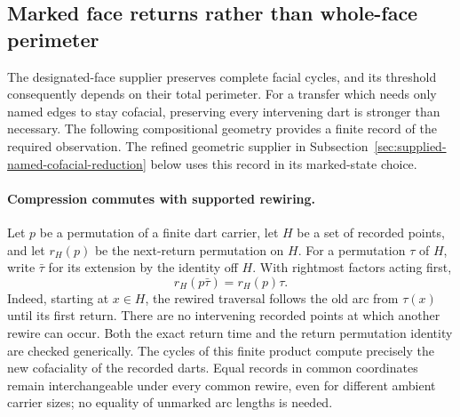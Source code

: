 \subsection{Marked face returns rather than whole-face perimeter}
\label{sec:marked-face-return-rewire}

The designated-face supplier preserves complete facial cycles, and its
threshold consequently depends on their total perimeter. For a transfer
which needs only named edges to stay cofacial, preserving every intervening
dart is stronger than necessary. The following compositional geometry
provides a finite record of the required observation. The refined geometric
supplier in Subsection~\ref{sec:supplied-named-cofacial-reduction} below
uses this record in its marked-state choice.

\paragraph{Compression commutes with supported rewiring.}
Let $p$ be a permutation of a finite dart carrier, let $H$ be a set of
recorded points, and let $r_H(p)$ be the next-return permutation on $H$.
For a permutation $\tau$ of $H$, write $\bar\tau$ for its extension by
the identity off $H$. With rightmost factors acting first,
\[
 r_H(p\bar\tau)=r_H(p)\tau.
\]
Indeed, starting at $x\in H$, the rewired traversal follows the old arc
from $\tau(x)$ until its first return. There are no intervening recorded
points at which another rewire can occur. Both the exact return time and
the return permutation identity are checked generically.
The cycles of this finite product compute precisely the new cofaciality
of the recorded darts. Equal records in common coordinates remain
interchangeable under every common rewire, even for different ambient
carrier sizes; no equality of unmarked arc lengths is needed.

